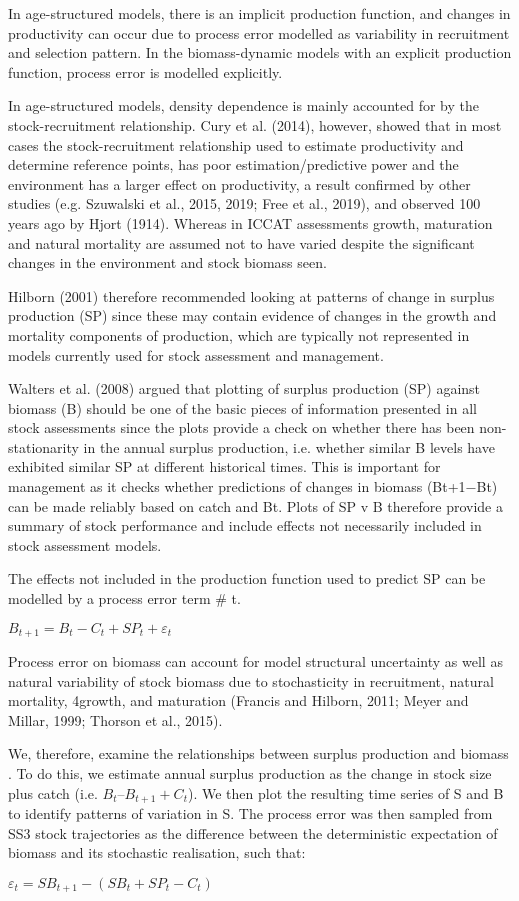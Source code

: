 In age-structured models, there is an implicit production function, and changes in productivity can occur due to process error modelled as variability in recruitment and selection pattern. In the biomass-dynamic models with an explicit production function, process error is modelled explicitly.

In age-structured models, density dependence is mainly accounted for by the stock-recruitment relationship. Cury et al. (2014), however, showed that in most cases the stock-recruitment relationship used to estimate productivity and determine reference points, has poor estimation/predictive power and the environment has a larger effect on productivity, a result confirmed by other studies (e.g. Szuwalski et al., 2015, 2019; Free et al., 2019), and observed 100 years ago by Hjort (1914). Whereas in ICCAT assessments growth, maturation and natural mortality are assumed not to have varied despite the significant changes in the environment and stock biomass seen.

Hilborn (2001) therefore recommended looking at patterns of change in surplus production (SP) since these may contain evidence of changes in the growth and mortality components of production, which are typically not represented in models currently used for stock assessment and management. 

Walters et al. (2008) argued that plotting of surplus production (SP) against biomass (B) should be one of the basic pieces of information presented in all stock assessments since the plots provide a check on whether there has been non-stationarity in the annual surplus production, i.e. whether similar B levels have exhibited similar SP at different historical times. This is important for management as it checks whether predictions of changes in biomass (Bt+1−Bt) can be made reliably based on catch and Bt. Plots of SP v B therefore provide a summary of stock performance and include effects not necessarily included in stock assessment models.

The effects not included in the production function used to predict SP can be modelled by a process error term # t.

				$B_{t+1} = B_t − C_t + SP_t + ε_t$

Process error on biomass can account for model structural uncertainty as well as natural variability of stock biomass due to stochasticity in recruitment, natural mortality, 4growth, and maturation (Francis and Hilborn, 2011; Meyer and Millar, 1999; Thorson et al., 2015).

We, therefore, examine the relationships between surplus production and biomass . To do this, we estimate annual surplus production as the change in stock size plus catch (i.e. $B_t – B_{t+1} + C_t$). We then plot the resulting time series of S and B to identify patterns of variation in S. The process error was then sampled from SS3 stock trajectories as the difference between the deterministic expectation of biomass and its stochastic realisation, such that:

				$ε_t = SB_{t+1} - (SB_t + SP_t − C_t)$ 

